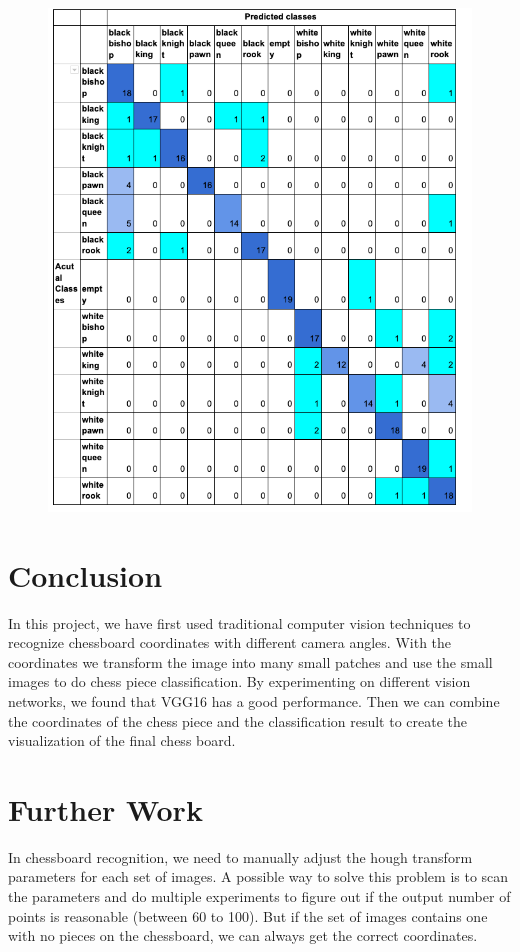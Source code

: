 \documentclass[a4paper,12pt]{article}
\begin{document}
\begin{spacing}{1.3}
\begin{figure}[H]
	\centering
	\includegraphics[scale=0.6]{11.png}
\end{figure}


\section{Conclusion}
In this project, we have first used traditional computer vision techniques to recognize chessboard coordinates with different camera angles. With the coordinates we transform the image into many small patches and use the small images to do chess piece classification. By experimenting on different vision networks, we found that VGG16 has a good performance. Then we can combine the coordinates of the chess piece and the classification result to create the visualization of the final chess board.


\section{Further Work}
In chessboard recognition, we need to manually adjust the hough transform parameters for each set of images. A possible way to solve this problem is to scan the parameters and do multiple experiments to figure out if the output number of points is reasonable (between 60 to 100). But if the set of images contains one with no pieces on the chessboard, we can always get the correct coordinates. 


\end{spacing}
\end{document}
